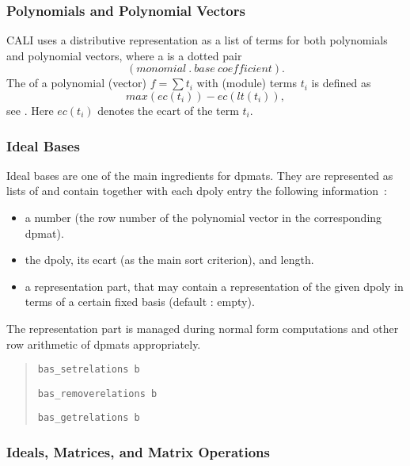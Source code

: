 \subsubsection*{Polynomials and Polynomial Vectors}

CALI uses a distributive representation as a list of terms for both
polynomials and polynomial vectors, where a  is a dotted
pair
\[(monomial\ .\ base\ coefficient).\] 
The  of a polynomial (vector) $f=\sum{t_i}$ with (module)
terms $t_i$ is defined as \[max(ec(t_i))-ec(lt(t_i)),\] see
\cite{Gr23}. Here $ec(t_i)$ denotes the ecart of the term $t_i$.

\subsubsection*{Ideal Bases}

Ideal bases are one of the main ingredients for dpmats. They are
represented as lists of  and contain together with
each dpoly entry the following information~:
\begin{itemize}
\item a number (the row number of the polynomial vector in the
corresponding dpmat).

\item the dpoly, its ecart (as the main sort criterion), and length. 

\item a representation part, that may contain a representation of the
given dpoly in terms of a certain fixed basis (default : empty).
\end{itemize}

The representation part is managed during normal form computations
and other row arithmetic of dpmats appropriately.
\begin{quote}
\verb|bas_setrelations b| 


\verb|bas_removerelations b| 


\verb|bas_getrelations b| 

\end{quote}


\subsubsection*{Ideals, Matrices, and Matrix Operations}

